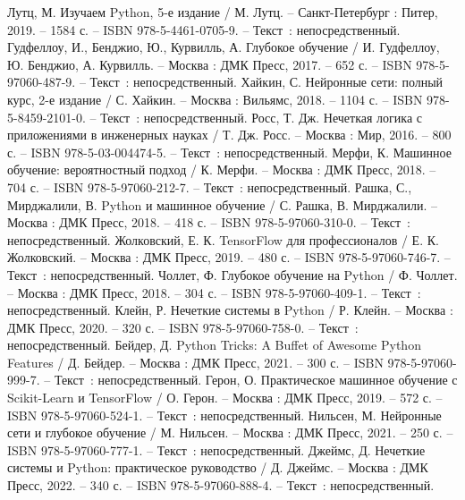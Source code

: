 
\begin{thebibliography}{13}

     Лутц, М. Изучаем Python, 5-е издание / М. Лутц. – Санкт-Петербург : Питер, 2019. – 1584 с. – ISBN 978-5-4461-0705-9. – Текст~: непосредственный.
     Гудфеллоу, И., Бенджио, Ю., Курвилль, А. Глубокое обучение / И. Гудфеллоу, Ю. Бенджио, А. Курвилль. – Москва : ДМК Пресс, 2017. – 652 с. – ISBN 978-5-97060-487-9. – Текст~: непосредственный.
     Хайкин, С. Нейронные сети: полный курс, 2-е издание / С. Хайкин. – Москва : Вильямс, 2018. – 1104 с. – ISBN 978-5-8459-2101-0. – Текст~: непосредственный.
     Росс, Т. Дж. Нечеткая логика с приложениями в инженерных науках / Т. Дж. Росс. – Москва : Мир, 2016. – 800 с. – ISBN 978-5-03-004474-5. – Текст~: непосредственный.
     Мерфи, К. Машинное обучение: вероятностный подход / К. Мерфи. – Москва : ДМК Пресс, 2018. – 704 с. – ISBN 978-5-97060-212-7. – Текст~: непосредственный.
     Рашка, С., Мирджалили, В. Python и машинное обучение / С. Рашка, В. Мирджалили. – Москва : ДМК Пресс, 2018. – 418 с. – ISBN 978-5-97060-310-0. – Текст~: непосредственный.
     Жолковский, Е. К. TensorFlow для профессионалов / Е. К. Жолковский. – Москва : ДМК Пресс, 2019. – 480 с. – ISBN 978-5-97060-746-7. – Текст~: непосредственный.
     Чоллет, Ф. Глубокое обучение на Python / Ф. Чоллет. – Москва : ДМК Пресс, 2018. – 304 с. – ISBN 978-5-97060-409-1. – Текст~: непосредственный.
     Клейн, Р. Нечеткие системы в Python / Р. Клейн. – Москва : ДМК Пресс, 2020. – 320 с. – ISBN 978-5-97060-758-0. – Текст~: непосредственный.
     Бейдер, Д. Python Tricks: A Buffet of Awesome Python Features / Д. Бейдер. – Москва : ДМК Пресс, 2021. – 300 с. – ISBN 978-5-97060-999-7. – Текст~: непосредственный.
     Герон, О. Практическое машинное обучение с Scikit-Learn и TensorFlow / О. Герон. – Москва : ДМК Пресс, 2019. – 572 с. – ISBN 978-5-97060-524-1. – Текст~: непосредственный.
     Нильсен, М. Нейронные сети и глубокое обучение / М. Нильсен. – Москва : ДМК Пресс, 2021. – 250 с. – ISBN 978-5-97060-777-1. – Текст~: непосредственный.
     Джеймс, Д. Нечеткие системы и Python: практическое руководство / Д. Джеймс. – Москва : ДМК Пресс, 2022. – 340 с. – ISBN 978-5-97060-888-4. – Текст~: непосредственный.

\end{thebibliography}
